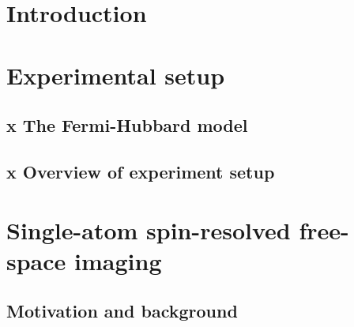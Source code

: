 \documentclass[twoside]{article}
\begin{document}






 \newpage


\newpage
\section{Introduction} \label{sec:intro}


\newpage
\section{Experimental setup} \label{sec:exp-setup}


\subsection{x The Fermi-Hubbard model} \label{subsec:exp-setup-fh}


\newpage
\subsection{x Overview of experiment setup} \label{subsec:exp-setup-overview}



\newpage
\section{Single-atom spin-resolved free-space imaging} \label{sec:imaging}

\subsection{Motivation and background} \label{subsec:imaging-motivation}
\end{document}
